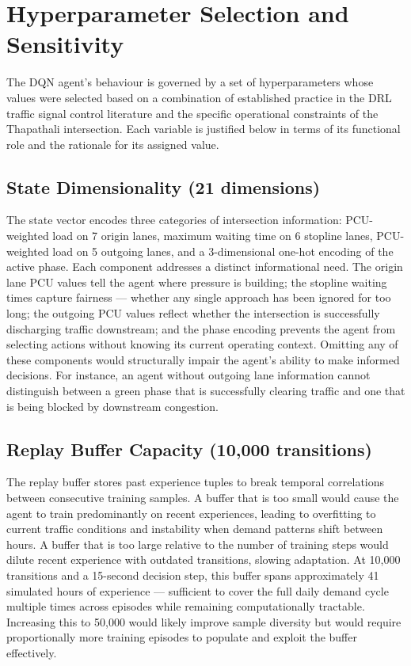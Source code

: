 \chapter{Hyperparameter Selection and Sensitivity}

The DQN agent's behaviour is governed by a set of hyperparameters whose values were selected based on a combination of established practice in the DRL traffic signal control literature and the specific operational constraints of the Thapathali intersection. Each variable is justified below in terms of its functional role and the rationale for its assigned value.

\section{State Dimensionality (21 dimensions)}

The state vector encodes three categories of intersection information: PCU-weighted load on 7 origin lanes, maximum waiting time on 6 stopline lanes, PCU-weighted load on 5 outgoing lanes, and a 3-dimensional one-hot encoding of the active phase. Each component addresses a distinct informational need. The origin lane PCU values tell the agent where pressure is building; the stopline waiting times capture fairness — whether any single approach has been ignored for too long; the outgoing PCU values reflect whether the intersection is successfully discharging traffic downstream; and the phase encoding prevents the agent from selecting actions without knowing its current operating context. Omitting any of these components would structurally impair the agent's ability to make informed decisions. For instance, an agent without outgoing lane information cannot distinguish between a green phase that is successfully clearing traffic and one that is being blocked by downstream congestion.

\section{Replay Buffer Capacity (10,000 transitions)}

The replay buffer stores past experience tuples to break temporal correlations between consecutive training samples. A buffer that is too small would cause the agent to train predominantly on recent experiences, leading to overfitting to current traffic conditions and instability when demand patterns shift between hours. A buffer that is too large relative to the number of training steps would dilute recent experience with outdated transitions, slowing adaptation. At 10,000 transitions and a 15-second decision step, this buffer spans approximately 41 simulated hours of experience — sufficient to cover the full daily demand cycle multiple times across episodes while remaining computationally tractable. Increasing this to 50,000 would likely improve sample diversity but would require proportionally more training episodes to populate and exploit the buffer effectively.

